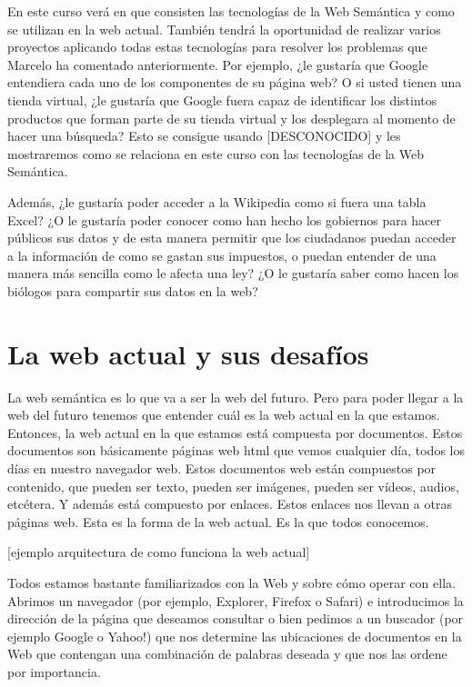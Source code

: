  En este curso verá en que consisten las tecnologías de la Web Semántica y como se utilizan en la web actual. También tendrá la oportunidad de realizar varios proyectos aplicando todas estas tecnologías para resolver los problemas que Marcelo ha comentado anteriormente. Por ejemplo, ¿le gustaría que Google entendiera cada uno de los componentes de su página web? O si usted tienen una tienda virtual, ¿le gustaría que Google fuera capaz de identificar los distintos productos que forman parte de su tienda virtual y los desplegara al momento de hacer una búsqueda? Esto se consigue usando [DESCONOCIDO] y les mostraremos como se relaciona en este curso con las tecnologías de la Web Semántica.
 
 Además, ¿le gustaría poder acceder a la Wikipedia como si fuera una tabla Excel? ¿O le gustaría poder conocer como han hecho los gobiernos para hacer públicos sus datos y de esta manera permitir que los ciudadanos puedan acceder a la información de como se gastan sus impuestos, o puedan entender de una manera más sencilla como le afecta una ley? ¿O le gustaría saber como hacen los biólogos para compartir sus datos en la web?
 
 \section{La web actual y sus desafíos}
 
 La web semántica es lo que va a ser la web del futuro. Pero para poder llegar a la web del futuro tenemos que entender cuál es la web actual en la que estamos. Entonces, la web actual en la que estamos está compuesta por documentos. Estos documentos son básicamente páginas web html que vemos cualquier día, todos los días en nuestro navegador web. Estos documentos web están compuestos por contenido, que pueden ser texto, pueden ser imágenes, pueden ser vídeos, audios, etcétera. Y además está compuesto por enlaces. Estos enlaces nos llevan a otras páginas web. Esta es la forma de la web actual. Es la que todos conocemos.
 
 [ejemplo arquitectura de como funciona la web actual]
 
  Todos estamos bastante familiarizados con la Web y sobre cómo operar con ella. Abrimos un navegador (por ejemplo, Explorer, Firefox o Safari) e introducimos la dirección de la página que deseamos consultar o bien pedimos a un buscador (por ejemplo Google o Yahoo!) que nos determine las ubicaciones de documentos en la Web que contengan una combinación de palabras deseada y que nos las ordene por importancia.­ %
 
